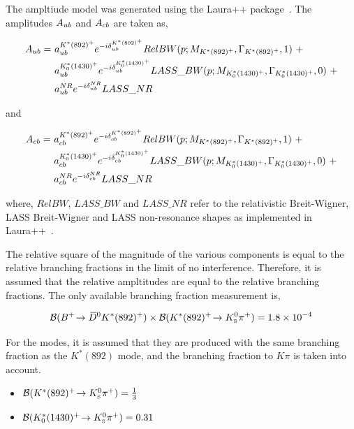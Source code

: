 The ampltiude model was generated using the Laura++ package~\cite{Laura}. The amplitudes $A_{{u}{b}}$ and $A_{{c}{b}}$ are taken as,

\begin{align*}
A_{\uquark\bquark} =\ & a_{\uquark\bquark}^{K^*(892)^+}e^{-i\delta_{\uquark\bquark}^{K^*(892)^+}}RelBW(p;M_{K^*(892)^+},\Gamma_{K^*(892)^+},1)\ + \\
& a_{\uquark\bquark}^{K^*_0(1430)^+}e^{-i\delta_{\uquark\bquark}^{K^*_0(1430)^+}}LASS\_BW(p;M_{K^*_0(1430)^+},\Gamma_{K^*_0(1430)^+},0)\ + \\
& a_{\uquark\bquark}^{NR}e^{-i\delta_{\uquark\bquark}^{NR}}LASS\_NR
\end{align*}

and

\begin{align*}
A_{\cquark\bquark} =\ & a_{\cquark\bquark}^{K^*(892)^+}e^{-i\delta_{\cquark\bquark}^{K^*(892)^+}}RelBW(p;M_{K^*(892)^+},\Gamma_{K^*(892)^+},1)\ + \\
& a_{\cquark\bquark}^{K^*_0(1430)^+}e^{-i\delta_{\cquark\bquark}^{K^*_0(1430)^+}}LASS\_BW(p;M_{K^*_0(1430)^+},\Gamma_{K^*_0(1430)^+},0)\ + \\
& a_{\cquark\bquark}^{NR}e^{-i\delta_{\cquark\bquark}^{NR}}LASS\_NR
\end{align*}

where, $RelBW$, $LASS\_BW$ and $LASS\_NR$ refer to the relativistic Breit-Wigner, LASS Breit-Wigner and LASS non-resonance shapes as implemented in Laura++~\cite{Laura}. 

The relative square of the magnitude of the various components is equal to the relative branching fractions in the limit of no interference. Therefore, it is assumed that the relative ampltitudes are equal to the relative branching fractions. The only available branching fraction measurement is,

\begin{equation*}
{\ensuremath{\mathcal{B}}}({{{B}^+}}\!\rightarrow {\ensuremath{{\kern 0.2em\overline{\kern -0.2em D}{}}{}^0}} K^*(892)^+) \times {\ensuremath{\mathcal{B}}}(K^*(892)^+\!\rightarrow {\ensuremath{{K}^0_{\mathrm{ \scriptscriptstyle S}}}}{\ensuremath{{\pi}^+}}) = 1.8 \times 10^{-4}
\end{equation*}

For the \Kstar modes, it is assumed that they are produced with the same branching fraction as the $K^*(892)$ mode, and the branching fraction to $K\pi$ is taken into account.

\begin{itemize}
\item ${\mathcal{B}}(K^*(892)^+\!\rightarrow {\ensuremath{{K}^0_{\mathrm{ \scriptscriptstyle S}}}}{\ensuremath{{\pi}^+}}) = \frac{1}{3}$
\item ${\mathcal{B}}(K^*_0(1430)^+\!\rightarrow {\ensuremath{{K}^0_{\mathrm{ \scriptscriptstyle S}}}}{\ensuremath{{\pi}^+}}) = 0.31$
\end{itemize}

